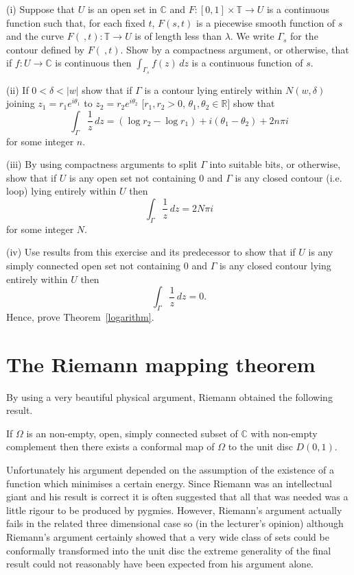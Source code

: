 \begin{exercise} (i) Suppose that $U$ is an open set
in ${\mathbb C}$ and
$F:[0,1]\times{\mathbb T}\rightarrow U$ is a continuous
function such that, for each fixed $t$,
$F(s,t)$ is a piecewise
smooth function of $s$ and the curve
$F(\ ,t):{\mathbb T}\rightarrow U$ is of length less than
$\lambda$. We write $\Gamma_{s}$ for the contour
defined by $F(\ ,t)$. Show by a compactness argument, or
otherwise, that if $f:U\rightarrow{\mathbb C}$ is continuous
then
$\int_{\Gamma_{s}}f(z)\,dz$ is a continuous function of $s$.

(ii) If $0<\delta<|w|$ show that if $\Gamma$ is a contour
lying entirely within $N(w,\delta)$ joining 
$z_{1}=r_{1}e^{i\theta_{1}}$ to $z_{2}=r_{2}e^{i\theta_{2}}$
[$r_{1},r_{2}>0$, $\theta_{1},\theta_{2}\in{\mathbb R}$]
show that
\[\int_{\Gamma}\frac{1}{z}\,dz=(\log r_{2}-\log r_{1})
+i(\theta_{1}-\theta_{2})+2n\pi i\]
for some integer $n$.

(iii) By using compactness arguments to split
$\Gamma$ into suitable bits, or otherwise,
show that if $U$ is any open set not containing $0$
and $\Gamma$ is any closed contour (i.e. loop)
lying entirely within $U$ then
\[\int_{\Gamma}\frac{1}{z}\,dz=2N\pi i\]
for some integer $N$.

(iv) Use results from this exercise and its 
predecessor to show that if $U$ is any simply
connected open set not containing $0$
and $\Gamma$ is any closed contour
lying entirely within $U$ then
\[\int_{\Gamma}\frac{1}{z}\,dz=0.\]
Hence, prove Theorem~\ref{logarithm}.
\end{exercise} 
\section{The Riemann mapping theorem} By using a very 
beautiful physical argument,  Riemann obtained the
following result.
\begin{theorem}%
\label{Riemann mapping theorem}
If $\Omega$ is an non-empty,
open, simply connected subset
of $\mathbb C$ with non-empty complement
then there exists a conformal
map of $\Omega$ to the unit disc $D(0,1)$.
\end{theorem}
Unfortunately his argument depended on the assumption
of the existence
of a function which minimises a certain energy.
Since Riemann was an intellectual giant 
and his result is correct
it is often suggested that all that was needed was
a little rigour to be produced by pygmies.
However, Riemann's argument actually fails in
the related three dimensional case  so (in
the lecturer's opinion) although Riemann's
argument certainly showed that a  very wide class
of sets could be conformally transformed into
the unit disc the extreme generality of the final
result could not reasonably have been expected
from his argument alone.


